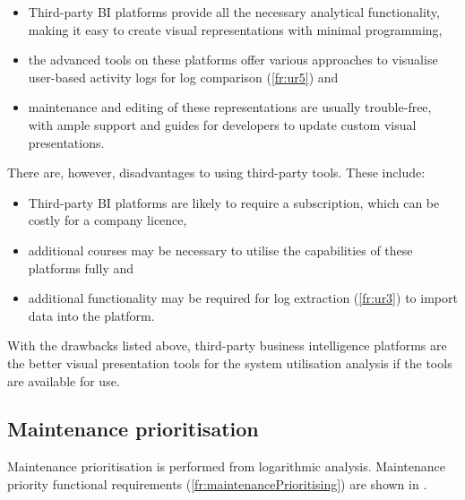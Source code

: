 \begin{itemize}
	\item \RaggedRight Third-party BI platforms provide all the necessary analytical functionality, making it easy to create visual representations with minimal programming,
	\item \RaggedRight the advanced tools on these platforms offer various approaches to visualise user-based activity logs for log comparison (\ref{fr:ur5}) and
	\item \RaggedRight maintenance and editing of these representations are usually trouble-free, with ample support and guides for developers to update custom visual presentations.
\end{itemize}

\clearpage

There are, however, disadvantages to using third-party tools. These include:

\begin{itemize}
	\item \RaggedRight Third-party BI platforms are likely to require a subscription, which can be costly for a company licence,
	\item \RaggedRight additional courses may be necessary to utilise the capabilities of these platforms fully and
	\item \RaggedRight additional functionality may be required for log extraction (\ref{fr:ur3}) to import data into the platform.
	\end{itemize}

With the drawbacks listed above, third-party business intelligence platforms are the better visual presentation tools for the system utilisation analysis if the tools are available for use.

\subsection{Maintenance prioritisation}\label{sec:ch2_utilisationImprovements}
Maintenance prioritisation is performed from logarithmic analysis. Maintenance priority functional requirements (\ref{fr:maintenancePrioritising}) are shown in .

